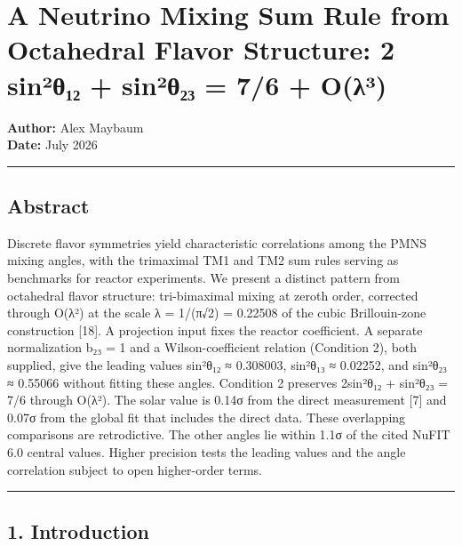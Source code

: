 \documentclass[
]{article}
\author{}
\date{}
\begin{document}
\hypertarget{a-neutrino-mixing-sum-rule-from-octahedral-flavor-structure-2-sinuxb2ux3b8ux2081ux2082-sinuxb2ux3b8ux2082ux2083-76-oux3bbuxb3}{%
\section{A Neutrino Mixing Sum Rule from Octahedral Flavor Structure: 2
sin²θ₁₂ + sin²θ₂₃ = 7/6 +
O(λ³)}\label{a-neutrino-mixing-sum-rule-from-octahedral-flavor-structure-2-sinuxb2ux3b8ux2081ux2082-sinuxb2ux3b8ux2082ux2083-76-oux3bbuxb3}}

\textbf{Author:} Alex Maybaum\\
\textbf{Date:} July 2026

\begin{center}\rule{0.5\linewidth}{0.5pt}\end{center}

\hypertarget{abstract}{%
\subsection{Abstract}\label{abstract}}

Discrete flavor symmetries yield characteristic correlations among the
PMNS mixing angles, with the trimaximal TM1 and TM2 sum rules serving as
benchmarks for reactor experiments. We present a distinct pattern from
octahedral flavor structure: tri-bimaximal mixing at zeroth order,
corrected through O(λ²) at the scale λ = 1/(π√2) = 0.22508 of the cubic
Brillouin-zone construction {[}18{]}. A projection input fixes the
reactor coefficient. A separate normalization b₂₃ = 1 and a
Wilson-coefficient relation (Condition 2), both supplied, give the
leading values sin²θ₁₂ ≈ 0.308003, sin²θ₁₃ ≈ 0.02252, and sin²θ₂₃ ≈
0.55066 without fitting these angles. Condition 2 preserves 2sin²θ₁₂ +
sin²θ₂₃ = 7/6 through O(λ²). The solar value is 0.14σ from the direct
measurement {[}7{]} and 0.07σ from the global fit that includes the
direct data. These overlapping comparisons are retrodictive. The other
angles lie within 1.1σ of the cited NuFIT 6.0 central values. Higher
precision tests the leading values and the angle correlation subject to
open higher-order terms.

\begin{center}\rule{0.5\linewidth}{0.5pt}\end{center}

\hypertarget{introduction}{%
\subsection{1. Introduction}\label{introduction}}
\end{document}
